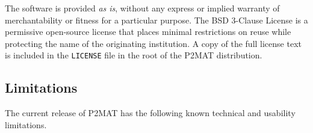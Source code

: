The software is provided \emph{as is}, without any express or implied warranty
of merchantability or fitness for a particular purpose.
The BSD 3-Clause License is a permissive open-source license that places
minimal restrictions on reuse while protecting the name of the originating
institution.
A copy of the full license text is included in the \texttt{LICENSE} file in
the root of the P2MAT distribution.

\subsection{Limitations}
\label{subsec:limitations}

The current release of P2MAT has the following known technical and usability
limitations.

